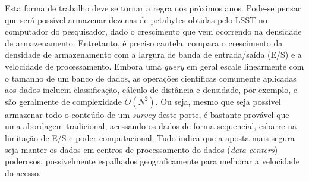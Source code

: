 Esta forma de trabalho deve se tornar a regra nos próximos anos. Pode-se pensar
que será possível armazenar dezenas de petabytes obtidas pelo LSST no computador
do pesquisador, dado o crescimento que vem ocorrendo na densidade de
armazenamento. Entretanto, é preciso cautela. \citet{Way2011} compara o
crescimento da densidade de armazenamento com a largura de banda de
entrada/saída (E/S) e a velocidade de processamento. Embora uma {\em query} em
geral escale linearmente com o tamanho de um banco de dados, as operações
científicas comumente aplicadas aos dados incluem classificação, cálculo de
distância e densidade, por exemplo, e são geralmente de complexidade $O(N^2)$.
Ou seja, mesmo que seja possível armazenar todo o conteúdo de um {\em survey}
deste porte, é bastante provável que uma abordagem tradicional, acessando os
dados de forma sequencial, esbarre na limitação de E/S e poder computacional.
Tudo indica que a aposta mais segura seja manter os dados em centros de
processamento do dados ({\em data centers}) poderosos, possivelmente espalhados
geograficamente para melhorar a velocidade do acesso.

